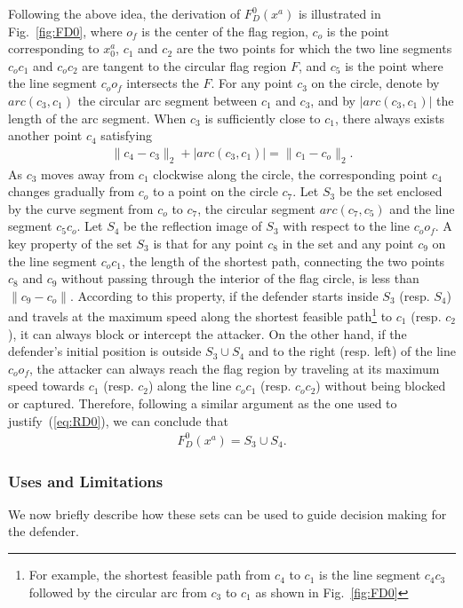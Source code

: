 \documentclass[letterpaper, 10 pt, conference]{ieeeconf}  %
\numberwithin{algorithm}{section}
\begin{document}
Following the above idea, the derivation of $F_D^0(x^a)$ is illustrated in Fig.~\ref{fig:FD0}, where $o_f$ is the center of the flag region, $c_o$ is the point corresponding to $x^a_0$, $c_1$ and $c_2$ are the two points for which the two line segments $c_oc_1$ and $c_oc_2$ are tangent to the circular flag region $F$, and $c_5$ is the point where the line segment $c_oo_f$ intersects the $F$. For any point $c_3$ on the circle, denote by $arc(c_3,c_1)$ the circular arc segment between $c_1$ and $c_3$, and by $|arc(c_3,c_1)|$ the length of the arc segment. When $c_3$ is sufficiently close to $c_1$, there always exists another point $c_4$ satisfying
\begin{align*}
\|c_4 - c_3\|_2+|arc(c_3,c_1)| = \|c_1-c_o\|_2. 
\end{align*}
As $c_3$ moves away from $c_1$ clockwise along the circle, the corresponding point $c_4$ changes gradually from $c_o$ to a point on the circle $c_7$. Let $S_3$ be the set enclosed by the curve segment from $c_o$ to $c_7$, the circular segment $arc(c_7,c_5)$ and the line segment $c_5c_o$. Let $S_4$ be the reflection image of $S_3$ with respect to the line $c_oo_f$. A key property of the set $S_3$ is that for any point $c_8$ in the set and any point $c_9$ on the line segment $c_oc_1$, the length of the shortest path, connecting the two points $c_8$ and $c_9$ without passing through the interior of the flag circle, is less than $\|c_9-c_o\|$. According to this property, if the defender starts inside $S_3$ (resp. $S_4$) and travels at the maximum speed along the shortest feasible path\footnote{For example, the shortest feasible path from $c_4$ to $c_1$ is the line segment $c_4c_3$ followed by the circular arc from $c_3$ to $c_1$ as shown in Fig.~\ref{fig:FD0}} to $c_1$ (resp. $c_2$), it can always block or intercept the attacker. On the other hand, if the defender's initial position is outside $S_3\cup S_4$ and to the right (resp. left) of the line $c_oo_f$, the attacker can always reach the flag region by traveling at its maximum speed towards $c_1$ (resp. $c_2$) along the line $c_oc_1$ (resp. $c_oc_2$) without being blocked or captured. Therefore, following a similar argument as the one used to justify~(\ref{eq:RD0}), we can conclude that
\begin{align}
F_D^0(x^a) = S_3 \cup S_4. 
\end{align}

\subsubsection{Uses and Limitations}
We now briefly describe how these sets can be used to guide decision making for the defender. 
 
\end{document}
